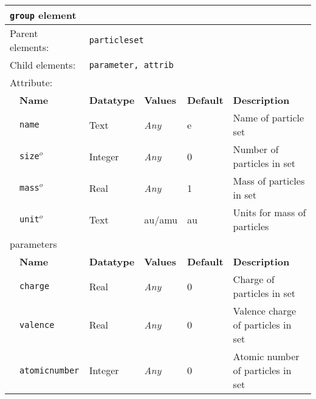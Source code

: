\begin{table}[h]
\begin{center}
\begin{tabularx}{\textwidth}{l l l l l X }
\hline
\multicolumn{6}{l}{\texttt{group} element} \\
\hline
\multicolumn{2}{l}{Parent elements:} & \multicolumn{4}{l}{\texttt{particleset}}\\
\multicolumn{2}{l}{Child  elements:} & \multicolumn{4}{l}{\texttt{parameter, attrib}}\\
\multicolumn{2}{l}{Attribute:} & \multicolumn{4}{l}{}\\
   &   \bfseries Name            & \bfseries Datatype & \bfseries Values & \bfseries Default   & \bfseries Description \\
   &   \texttt{name}               &  Text              &  \textit{Any}    &  e                & Name of particle set  \\
   &   \texttt{size}$^o$           &  Integer           &  \textit{Any}    &  0                & Number of particles in set \\
   &   \texttt{mass}$^o$           &  Real              &  \textit{Any}    &  1                & Mass of particles in set \\
   &   \texttt{unit}$^o$          &  Text              &  au/amu          &  au               & Units for mass of particles \\
\multicolumn{2}{l}{parameters}  & \multicolumn{4}{l}{}\\
   &   \bfseries Name     & \bfseries Datatype & \bfseries Values & \bfseries Default   & \bfseries Description \\
   &   \texttt{charge}    &  Real              &  \textit{Any}    &  0                  & Charge of particles in set \\
   &   \texttt{valence}   &  Real              &  \textit{Any}    &  0                  & Valence charge of particles in set \\
   &   \texttt{atomicnumber} &  Integer        &  \textit{Any}    &  0                  & Atomic number of particles in set \\
  \hline
  \hline
\end{tabularx}
\end{center}
\end{table}

